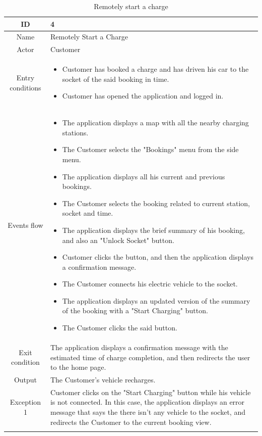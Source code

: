 \begin{longtable}{|c| p{10cm}|}
    \hline ID        & 4\\
    \hline
    Name     & Remotely Start a Charge \\
    \hline
    Actor            & Customer\\
    \hline
    Entry conditions & \begin{itemize}[nosep,after=\strut]
        \item Customer has booked a charge and has driven his car to the socket of the said booking in time.
        \item Customer has opened the application and logged in.
    \end{itemize}
        \\
    \hline
    Events flow      & \begin{itemize}[nosep,after=\strut]
        \item The application displays a map with all the nearby charging stations.
        \item The Customer selects the "Bookings" menu from the side menu.
        \item The application displays all his current and previous bookings.
        \item The Customer selects the booking related to current station, socket and time.
        \item The application displays the brief summary of his booking, and also an "Unlock Socket" button.
        \item Customer clicks the button, and then the application displays a confirmation message. 
        \item The Customer connects his electric vehicle to the socket.
        \item The application displays an updated version of the summary of the booking with a "Start Charging" button.
        \item The Customer clicks the said button.
    \end{itemize}\\
    \hline
    Exit condition   & The application displays a confirmation message with the estimated time of charge completion, and then redirects the user to the home page.\\
    \hline
    Output           &  The Customer's vehicle recharges.
    \\
    \hline
    \hline
    Exception 1      &  Customer clicks on the "Start Charging" button while his vehicle is not connected. In this case, the application displays an error message that says the there isn't any vehicle to the socket, and redirects the Customer to the current booking view. \\
    \hline
    \caption{Remotely start a charge}\\
\end{longtable}
